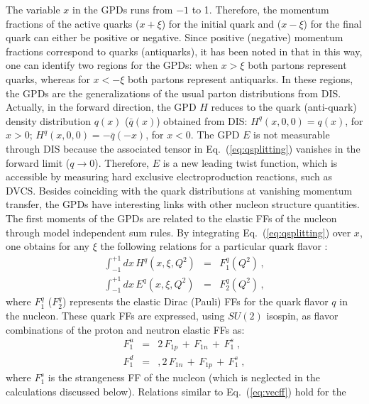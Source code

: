 \indent
The variable $x$ in the GPDs runs from $-1$ to 1.
Therefore, the momentum fractions of the
active quarks ($x + \xi$) for the initial quark and ($x - \xi$) for the final 
quark can either be positive or negative. Since positive
(negative) momentum fractions correspond to quarks (antiquarks), it
has been noted in \cite{Radyushkin:1996nd} that in this way, one can
identify two regions for the GPDs:
when $x > \xi$ both partons represent quarks, whereas for
$x < - \xi$ both partons represent antiquarks. In these regions,
the GPDs are the generalizations of the usual parton distributions from
DIS. Actually, in the forward direction, the GPD $H$ 
reduces to the quark (anti-quark) density distribution $q(x)$ 
($\bar q(x)$) obtained from DIS: 
$H^q(x,0,0) = q(x)$, for $x > 0$;  
$H^q(x,0,0) = - \bar q(-x)$, for $x < 0$. 
The GPD $E$ 
is not measurable through DIS because the associated tensor 
in Eq.~(\ref{eq:qsplitting}) vanishes in the forward limit ($q \to 0$).
Therefore, $E$ is a new leading twist function, which
is accessible by measuring hard exclusive electroproduction reactions, such 
as DVCS.
\newline
\indent
Besides coinciding with the quark distributions at vanishing momentum
transfer, the GPDs have interesting links with other
nucleon structure quantities. The first moments of the GPDs are related to
the elastic FFs
of the nucleon through model independent sum rules.
By integrating Eq.~(\ref{eq:qsplitting}) over \( x \), one
obtains for any $\xi$
the following relations for a particular quark flavor \cite{ji} :
\begin{eqnarray}
\int_{-1}^{+1}dx\, H^{q}(x,\xi ,Q^2)&=& F_{1}^{q}(Q^2)\, ,
				\nonumber\\
\int _{-1}^{+1}dx\, E^{q}(x,\xi ,Q^2)&=& F_{2}^{q}(Q^2)\, ,
\label{eq:ffsumrulehe}
\end{eqnarray}
where $F_1^q$ ($F_2^q$) represents the elastic Dirac (Pauli) FFs for the
 quark flavor $q$ in the nucleon. These quark FFs are expressed, 
using $SU(2)$ isospin, 
as flavor combinations of the proton and neutron elastic FFs as:
\begin{eqnarray}
F_{1}^u &=& 2\,F_{1 p}\,+\,F_{1 n}\,+\,F_{1}^{s}\; , 
			\nonumber\\
F_{1}^d &=&, 2\,F_{1 n}\,+\,F_{1 p}\,+\,F_{1}^{s}\; ,
\label{eq:vecff}
\end{eqnarray}
where $F_{1}^{s}$ 
is the strangeness FF of the nucleon (which is neglected in 
the calculations discussed below).
Relations similar to Eq.~(\ref{eq:vecff}) hold for the
